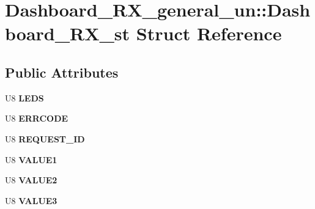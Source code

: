 \hypertarget{struct_dashboard___r_x__general__un_1_1_dashboard___r_x__st}{\section{Dashboard\-\_\-\-R\-X\-\_\-general\-\_\-un\-:\-:Dashboard\-\_\-\-R\-X\-\_\-st Struct Reference}
\label{struct_dashboard___r_x__general__un_1_1_dashboard___r_x__st}
}
\subsection*{Public Attributes}
\begin{DoxyCompactItemize}
\item 
\hypertarget{struct_dashboard___r_x__general__un_1_1_dashboard___r_x__st_a5d1ef0f19a7c60899403b1fa0814e9b0}{U8 {\bfseries L\-E\-D\-S}}\label{struct_dashboard___r_x__general__un_1_1_dashboard___r_x__st_a5d1ef0f19a7c60899403b1fa0814e9b0}

\item 
\hypertarget{struct_dashboard___r_x__general__un_1_1_dashboard___r_x__st_aabdcecdc1ea48b24201a26c18a9251c3}{U8 {\bfseries E\-R\-R\-C\-O\-D\-E}}\label{struct_dashboard___r_x__general__un_1_1_dashboard___r_x__st_aabdcecdc1ea48b24201a26c18a9251c3}

\item 
\hypertarget{struct_dashboard___r_x__general__un_1_1_dashboard___r_x__st_a5b497be193e43f58da77746a5fb7b198}{U8 {\bfseries R\-E\-Q\-U\-E\-S\-T\-\_\-\-I\-D}}\label{struct_dashboard___r_x__general__un_1_1_dashboard___r_x__st_a5b497be193e43f58da77746a5fb7b198}

\item 
\hypertarget{struct_dashboard___r_x__general__un_1_1_dashboard___r_x__st_a9dc8ee485edc4c3ec188c3c611fd21c0}{U8 {\bfseries V\-A\-L\-U\-E1}}\label{struct_dashboard___r_x__general__un_1_1_dashboard___r_x__st_a9dc8ee485edc4c3ec188c3c611fd21c0}

\item 
\hypertarget{struct_dashboard___r_x__general__un_1_1_dashboard___r_x__st_a8ca5cc747055d88e7af45eff4d2a156c}{U8 {\bfseries V\-A\-L\-U\-E2}}\label{struct_dashboard___r_x__general__un_1_1_dashboard___r_x__st_a8ca5cc747055d88e7af45eff4d2a156c}

\item 
\hypertarget{struct_dashboard___r_x__general__un_1_1_dashboard___r_x__st_a5f840e96bc9356a653d7e2d323f62b4d}{U8 {\bfseries V\-A\-L\-U\-E3}}\label{struct_dashboard___r_x__general__un_1_1_dashboard___r_x__st_a5f840e96bc9356a653d7e2d323f62b4d}


\end{DoxyCompactItemize}
